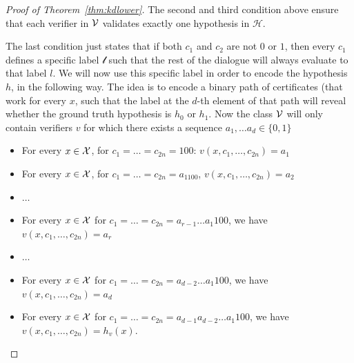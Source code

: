 \documentclass[11pt,letterpaper]{article}
\theoremstyle{definition}
\theoremstyle{plain}
\begin{document}
\begin{proof}[Proof of Theorem~\ref{thm:kdlower}]
    The second and third condition above ensure that each verifier in ${\mathcal V}$ validates exactly one hypothesis in $\mathcal{H}$.
    
    The last condition just states that if both $c_1$ and $c_2$ are not $0$ or $1$, then every $c_1$ defines a specific label $\mathcal{l}$ such that the rest of the dialogue will always evaluate to that label $l$.
    We will now use this specific label in order to encode the hypothesis $h$, in the following way.
    The idea is to encode a binary path of certificates (that work for every $x$, such that the label at the $d$-th element of that path will reveal whether the ground truth hypothesis is $h_0$ or $h_1$.
    Now the class ${\mathcal V}$ will only contain verifiers $v$ for which there exists a sequence $a_1, \dots a_d \in \{0,1\}$
    \begin{itemize}
        \item For every $x\in {\mathcal X}$, for $c_1 = \dots =c_{2n} = 100$: $v(x, c_1, \dots, c_{2n}) = a_1$
        \item For every $x\in {\mathcal X}$, for $c_1 = \dots =c_{2n} = a_1100$, $v(x, c_1, \dots, c_{2n}) = a_2$
        \item $\dots$
        \item For every $x \in {\mathcal X}$ for $c_1 = \dots = c_{2n} = a_{r-1} \dots a_1 1 00$, we have $v(x, c_1, \dots, c_{2n}) = a_r$
        \item $\dots$
        \item For every $x \in {\mathcal X}$ for $c_1 = \dots = c_{2n} = a_{d-2} \dots a_1 1 00$, we have $v(x, c_1, \dots, c_{2n}) = a_d$
        \item For every $x \in {\mathcal X}$ for $c_1 = \dots = c_{2n} = a_{d-1} a_{d-2} \dots a_1 1 00$, we have $v(x, c_1, \dots, c_{2n}) = h_v(x)$.
    \end{itemize}

\end{proof}
\end{document}
